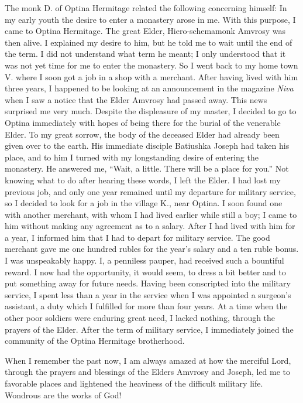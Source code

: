 \begin{longquote}{The monk D. of Optina Hermitage related the following concerning himself:}
In my early youth the desire to enter a monastery arose in me. With this purpose, I came to Optina Hermitage. The great Elder, Hiero-schemamonk Amvrosy was then alive. I explained my desire to him, but he told me to wait until the end of the term. I did not understand what term he meant; I only understood that it was not yet time for me to enter the monastery. So I went back to my home town V. where I soon got a job in a shop with a merchant. After having lived with him three years, I happened to be looking at an announcement in the magazine \textit{Niva} when I saw a notice that the Elder Amvrosy had passed away. This news surprised me very much. Despite the displeasure of my master, I decided to go to Optina immediately with hopes of being there for the burial of the venerable Elder. To my great sorrow, the body of the deceased Elder had already been given over to the earth. His immediate disciple Batiushka Joseph had taken his place, and to him I turned with my longstanding desire of entering the monastery. He answered me, ``Wait, a little. There will be a place for you.'' Not knowing what to do after hearing these words, I left the Elder. I had lost my previous job, and only one year remained until my departure for military service, so I decided to look for a job in the village K., near Optina. I soon found one with another merchant, with whom I had lived earlier while still a boy; I came to him without making any agreement as to a salary. After I had lived with him for a year, I informed him that I had to depart for military service. The good merchant gave me one hundred rubles for the year's salary and a ten ruble bonus. I was unspeakably happy. I, a penniless pauper, had received such a bountiful reward. I now had the opportunity, it would seem, to dress a bit better and to put something away for future needs. Having been conscripted into the military service, I spent less than a year in the service when I was appointed a surgeon's assistant, a duty which I fulfilled for more than four years. At a time when the other poor soldiers were enduring great need, I lacked nothing, through the prayers of the Elder. After the term of military service, I immediately joined the community of the Optina Hermitage brotherhood.

When I remember the past now, I am always amazed at how the merciful Lord, through the prayers and blessings of the Elders Amvrosy and Joseph, led me to favorable places and lightened the heaviness of the difficult military life. Wondrous are the works of God!
\end{longquote}


